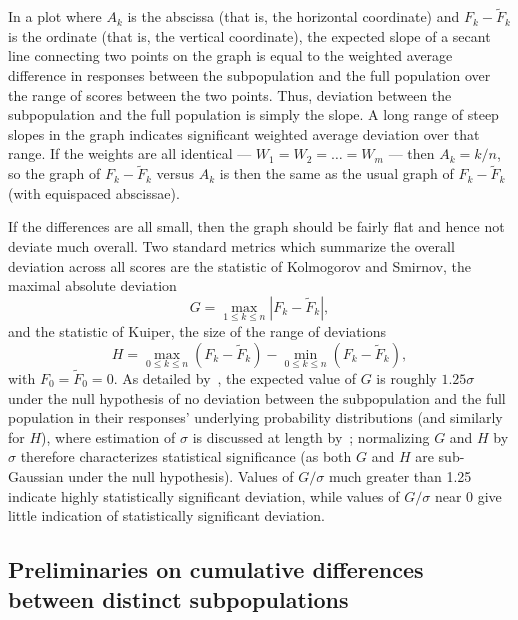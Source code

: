 \documentclass{article}
\begin{document}
In a plot where $A_k$ is the abscissa (that is, the horizontal coordinate)
and $F_k - \tilde{F}_k$ is the ordinate (that is, the vertical coordinate),
the expected slope of a secant line connecting two points on the graph is equal
to the weighted average difference in responses between the subpopulation
and the full population over the range of scores between the two points.
Thus, deviation between the subpopulation and the full population
is simply the slope. A long range of steep slopes in the graph
indicates significant weighted average deviation over that range.
If the weights are all identical ---
$W_1 = W_2 = \dots = W_m$ --- then $A_k = k/n$, so the graph
of $F_k - \tilde{F}_k$ versus $A_k$ is then the same as the usual graph
of $F_k - \tilde{F}_k$ (with equispaced abscissae).

If the differences are all small, then the graph should be fairly flat
and hence not deviate much overall.
Two standard metrics which summarize the overall deviation across all scores
are the statistic of Kolmogorov and Smirnov, the maximal absolute deviation
%
\begin{equation}
\label{Kolmogorov-Smirnov}
G = \max_{1 \le k \le n} |F_k - \tilde{F}_k|,
\end{equation}
%
and the statistic of Kuiper, the size of the range of deviations
%
\begin{equation}
\label{Kuiper}
H = \max_{0 \le k \le n} (F_k - \tilde{F}_k)
  - \min_{0 \le k \le n} (F_k - \tilde{F}_k),
\end{equation}
%
with $F_0 = \tilde{F}_0 = 0$.
As detailed by~\cite{tygert_full},
the expected value of $G$ is roughly $1.25\sigma$
under the null hypothesis of no deviation between the subpopulation
and the full population in their responses'
underlying probability distributions (and similarly for $H$),
where estimation of $\sigma$ is discussed at length by~\cite{tygert_full};
normalizing $G$ and $H$ by $\sigma$ therefore characterizes
statistical significance (as both $G$ and $H$ are sub-Gaussian
under the null hypothesis).
Values of $G/\sigma$ much greater than 1.25 indicate
highly statistically significant deviation,
while values of $G/\sigma$ near 0 give little indication
of statistically significant deviation.


\subsection{Preliminaries on cumulative differences
between distinct subpopulations}
\label{subpops}
\end{document}
